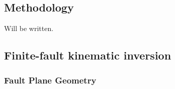 \subsection{Methodology}
Will be written.
\subsection{Finite-fault kinematic inversion}
\subsubsection*{Fault Plane Geometry}{}

